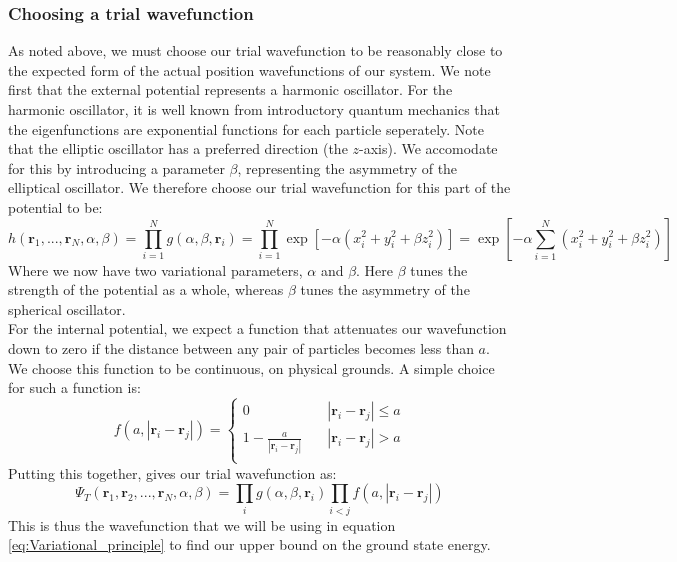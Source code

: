 \documentclass[a4paper, 10pt]{article}
\begin{document}
\subsubsection{Choosing a trial wavefunction}
As noted above, we must choose our trial wavefunction to be reasonably close to the expected form of the actual position wavefunctions of our system. We note first that the external potential represents a harmonic oscillator. For the harmonic oscillator, it is well known from introductory quantum mechanics that the eigenfunctions are exponential functions for each particle seperately. Note that the elliptic oscillator has a preferred direction (the $z$-axis). We accomodate for this by introducing a parameter $\beta$, representing the asymmetry of the elliptical oscillator. We therefore choose our trial wavefunction for this part of the potential to be:
\begin{equation}
h(\boldsymbol{r}_1, ..., \boldsymbol{r}_N, \alpha, \beta)=\prod_{i=1}^N g(\alpha,\beta, \boldsymbol{r}_i)=\prod_{i=1}^N \exp[-\alpha(x_i^2+y_i^2+\beta z_i^2)]=\exp[-\alpha \sum_{i=1}^N (x_i^2+y_i^2+\beta z_i^2)]
\end{equation}
Where we now have two variational parameters, $\alpha$ and $\beta$. Here $\beta$ tunes the strength of the potential as a whole, whereas $\beta$ tunes the asymmetry of the spherical oscillator.\\
\linebreak
For the internal potential, we expect a function that attenuates our wavefunction down to zero if the distance between any pair of particles becomes less than $a$. We choose this function to be continuous, on physical grounds. A simple choice for such a function is:
\begin{equation}
f(a,|\boldsymbol{r}_i-\boldsymbol{r}_j|)= 
     \begin{cases}
       0 & \quad |\boldsymbol{r}_i-\boldsymbol{r}_j| \leq  a\\
       1-\frac{a}{|\boldsymbol{r}_i-\boldsymbol{r}_j|} & \quad |\boldsymbol{r}_i-\boldsymbol{r}_j|>  a\\
     \end{cases}
\end{equation}
Putting this together, gives our trial wavefunction as:
\begin{equation}\label{eq:trial_wavefunction}
\Psi_T(\boldsymbol{r}_1, \boldsymbol{r}_2, ..., \boldsymbol{r}_N, \alpha, \beta)=\prod_ig(\alpha,\beta, \boldsymbol{r}_i)\prod_{i<j}f(a, |\boldsymbol{r}_i-\boldsymbol{r}_j|)
\end{equation}
This is thus the wavefunction that we will be using in equation \ref{eq:Variational_principle} to find our upper bound on the ground state energy.
\end{document}
